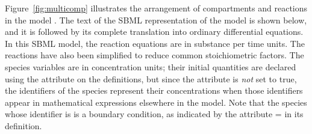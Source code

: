 Figure~\ref{fig:multicomp} illustrates the arrangement of
compartments and reactions in the model
.  The text of the SBML
representation of the model is shown below, and it is followed by
its complete translation into ordinary differential equations.  In
this SBML model, the reaction equations are in substance per time
units.  The reactions have also been simplified to reduce common
stoichiometric factors.  The species variables are in
concentration units; their initial quantities are declared using
the attribute  on the 
definitions, but since the attribute 
is \emph{not} set to true, the identifiers of the species
represent their concentrations when those identifiers appear in
mathematical expressions elsewhere in the model.  Note that the
species whose identifier is  is a boundary condition, as
indicated by the attribute = in
its definition.  


